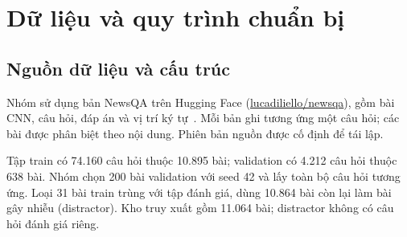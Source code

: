 \section{Dữ liệu và quy trình chuẩn bị}
\subsection{Nguồn dữ liệu và cấu trúc}
Nhóm sử dụng bản NewsQA trên Hugging Face (\href{https://huggingface.co/datasets/lucadiliello/newsqa}{lucadiliello/newsqa}), gồm bài CNN, câu hỏi, đáp án và vị trí ký tự~\cite{newsqa}. Mỗi bản ghi tương ứng một câu hỏi; các bài được phân biệt theo nội dung. Phiên bản nguồn được cố định để tái lập.

Tập train có 74.160 câu hỏi thuộc 10.895 bài; validation có 4.212 câu hỏi thuộc 638 bài. Nhóm chọn 200 bài validation với seed 42 và lấy toàn bộ câu hỏi tương ứng. Loại 31 bài train trùng với tập đánh giá, dùng 10.864 bài còn lại làm bài gây nhiễu (distractor). Kho truy xuất gồm 11.064 bài; distractor không có câu hỏi đánh giá riêng.

